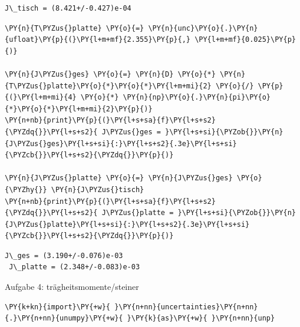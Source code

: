     \begin{Verbatim}[commandchars=\\\{\}]
 J\_tisch = (8.421+/-0.427)e-04
    \end{Verbatim}

    \begin{tcolorbox}[breakable, size=fbox, boxrule=1pt, pad at break*=1mm,colback=cellbackground, colframe=cellborder]
\begin{Verbatim}[commandchars=\\\{\}]
\PY{n}{T\PYZus{}platte} \PY{o}{=} \PY{n}{unc}\PY{o}{.}\PY{n}{ufloat}\PY{p}{(}\PY{l+m+mf}{2.355}\PY{p}{,} \PY{l+m+mf}{0.025}\PY{p}{)}

\PY{n}{J\PYZus{}ges} \PY{o}{=} \PY{n}{D} \PY{o}{*} \PY{n}{T\PYZus{}platte}\PY{o}{*}\PY{o}{*}\PY{l+m+mi}{2} \PY{o}{/} \PY{p}{(}\PY{l+m+mi}{4} \PY{o}{*} \PY{n}{np}\PY{o}{.}\PY{n}{pi}\PY{o}{*}\PY{o}{*}\PY{l+m+mi}{2}\PY{p}{)}
\PY{n+nb}{print}\PY{p}{(}\PY{l+s+sa}{f}\PY{l+s+s2}{\PYZdq{}}\PY{l+s+s2}{ J\PYZus{}ges = }\PY{l+s+si}{\PYZob{}}\PY{n}{J\PYZus{}ges}\PY{l+s+si}{:}\PY{l+s+s2}{.3e}\PY{l+s+si}{\PYZcb{}}\PY{l+s+s2}{\PYZdq{}}\PY{p}{)}

\PY{n}{J\PYZus{}platte} \PY{o}{=} \PY{n}{J\PYZus{}ges} \PY{o}{\PYZhy{}} \PY{n}{J\PYZus{}tisch}
\PY{n+nb}{print}\PY{p}{(}\PY{l+s+sa}{f}\PY{l+s+s2}{\PYZdq{}}\PY{l+s+s2}{ J\PYZus{}platte = }\PY{l+s+si}{\PYZob{}}\PY{n}{J\PYZus{}platte}\PY{l+s+si}{:}\PY{l+s+s2}{.3e}\PY{l+s+si}{\PYZcb{}}\PY{l+s+s2}{\PYZdq{}}\PY{p}{)}
\end{Verbatim}
\end{tcolorbox}

    \begin{Verbatim}[commandchars=\\\{\}]
 J\_ges = (3.190+/-0.076)e-03
 J\_platte = (2.348+/-0.083)e-03
    \end{Verbatim}

    Aufgabe 4: trägheitsmomente/steiner

    \begin{tcolorbox}[breakable, size=fbox, boxrule=1pt, pad at break*=1mm,colback=cellbackground, colframe=cellborder]
\begin{Verbatim}[commandchars=\\\{\}]
\PY{k+kn}{import}\PY{+w}{ }\PY{n+nn}{uncertainties}\PY{n+nn}{.}\PY{n+nn}{unumpy}\PY{+w}{ }\PY{k}{as}\PY{+w}{ }\PY{n+nn}{unp}
\end{Verbatim}
\end{tcolorbox}

